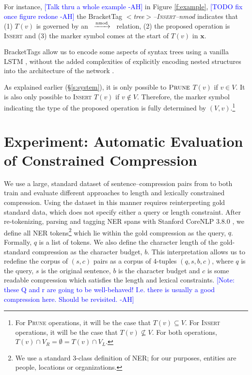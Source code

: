 \documentclass[11pt,a4paper]{article}
\newcommand{\rdep}[1]{\ $\xrightarrow{\text{\tiny #1}}$\ }
\newcommand{\ahcomment}[1]{\textcolor{blue}{[#1 -AH]}}
\begin{document}
For instance, \ahcomment{Talk thru a whole example} in Figure \ref{f:example}, \ahcomment{TODO fix once figure redone} the BracketTag \textit{$<$tree$>$--\textsc{Insert}--nmod} indicates that (1) $T(v)$ is governed by an \rdep{nmod} relation, (2) the proposed operation is \textsc{Insert} and (3) the marker symbol comes at the start of $T(v)$ in $\bm{x}$. 


BracketTags allow us to encode some aspects of syntax trees using a vanilla LSTM \cite{Vinyals2015GrammarAA,Aharoni2017TowardsSN}, without the added complexities of explicitly encoding nested structures into the architecture of the network \cite{Tai2015ImprovedSR,Dyer2016RecurrentNN}. 

As explained earlier (\S\ref{s:system}), it is only possible to $\textsc{Prune}$ $T(v)$ if $v \in V$. It is also only possible to \textsc{Insert} $T(v)$ if $v \notin V$. Therefore, the marker symbol indicating the type of the proposed operation is fully determined by $(V, v)$.\footnote{For \textsc{Prune} operations, it will be the case that $T(v) \subseteq V$. For \textsc{Insert} operations, it will be the case that $T(v) \nsubseteq V$. For both operations, $T(v) \cap V_R = \emptyset = T(v) \cap V_L $.} 

\section{Experiment: Automatic Evaluation of Constrained Compression}

We use a large, standard dataset of sentence--compression pairs from \citet{filippova2013overcoming} to both train and evaluate different approaches to length and lexically constrained compression. Using the dataset in this manner requires reinterpreting gold standard data, which does not specify either a query or length constraint. After re-tokenizing, parsing and tagging NER spans with Stanford CoreNLP 3.8.0 \cite{corenlp}, we define all NER tokens\footnote{We use a standard 3-class definition of NER; for our purposes, entities are people, locations or organizations.} which lie within the gold compression as the query, $q$. Formally, $q$ is a list of tokens. We also define the character length of the gold-standard compression as the character budget, $b$. This interpretation allows us to redefine the corpus of $(s,c)$ pairs as a corpus of 4-tuples $(q,s,b,c)$, where $q$ is the query, $s$ is the original sentence, $b$ is the character budget and $c$ is some readable compression which satisfies the length and lexical constraints.  \ahcomment{Note: these Q and r are going to be well-behaved! I.e. there is usually a good compression here. Should be revisited.}
\end{document}
